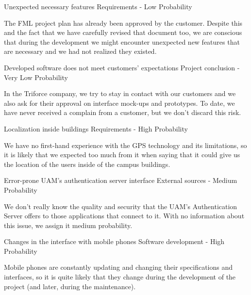 \begin{risk}[riskFeaturesUnexpected]{Unexpected necessary features}
\riskcat Requirements
 - Low Probability

The FML project plan has already been approved by the customer. Despite this and the fact that we have carefully revised that document too, we are conscious that during the development we might encounter unexpected new features that are necessary and we had not realized they existed.
\end{risk}

\begin{risk}[riskExpectations]{Developed software does not meet customers' expectations}
\riskcat Project conclusion
 - Very Low Probability

In the Triforce company, we try to stay in contact with our customers and we also ask for their approval on interface mock-ups and prototypes. To date, we have never received a complain from a customer, but we don't discard this risk.
\end{risk}

\begin{risk}[riskLocalization]{Localization inside buildings}
\riskcat Requirements
 - High Probability

We have no first-hand experience with the GPS technology and its limitations, so it is likely that we expected too much from it when saying that it could give us the location of the users inside of the campus buildings.
\end{risk}

\begin{risk}[riskAuthServer]{Error-prone UAM's authentication server interface}
\riskcat External sources
 - Medium Probability

We don't really know the quality and security that the UAM's Authentication Server offers to those applications that connect to it. With no information about this issue, we assign it medium probability.
\end{risk}

\begin{risk}[riskPhone]{Changes in the interface with mobile phones}
\riskcat Software development
 - High Probability

Mobile phones are constantly updating and changing their specifications and interfaces, so it is quite likely that they change during the development of the project (and later, during the maintenance).
\end{risk}

